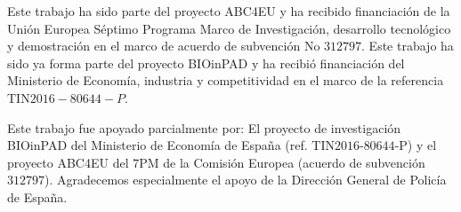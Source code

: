 
Este trabajo ha sido parte del proyecto \gls{ABC4EU} y ha recibido financiación de la Unión Europea Séptimo Programa Marco de Investigación, desarrollo tecnológico y demostración en el marco de acuerdo de subvención No $312797$. Este trabajo ha sido ya forma parte del proyecto \gls{BIOinPAD} y ha recibió financiación del Ministerio de Economía, industria y competitividad en el marco de la referencia TIN$2016-80644-P$.


Este trabajo fue apoyado parcialmente por: El proyecto de investigación BIOinPAD del Ministerio de Economía de España (ref. TIN$2016$-$80644$-P) y el proyecto \gls{ABC4EU} del $7$PM de la Comisión Europea (acuerdo de subvención $312797$). Agradecemos especialmente el apoyo de la Dirección General de Policía de España.

